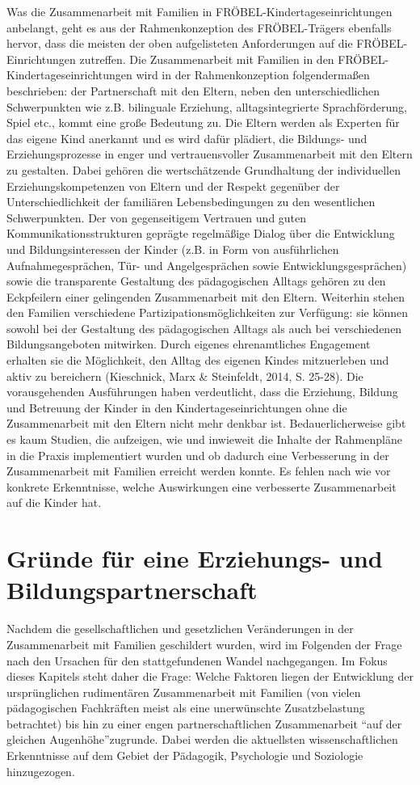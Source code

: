 \documentclass[12pt,a4paper]{article}
\begin{document}
Was die Zusammenarbeit mit Familien in FRÖBEL-Kindertageseinrichtungen anbelangt, geht es aus der Rahmenkonzeption des FRÖBEL-Trägers ebenfalls hervor, dass die meisten der oben aufgelisteten Anforderungen auf die FRÖBEL-Einrichtungen zutreffen. Die Zusammenarbeit mit Familien in den FRÖBEL-Kindertageseinrichtungen wird in der   Rahmenkonzeption folgendermaßen beschrieben: der Partnerschaft mit den Eltern, neben den unterschiedlichen Schwerpunkten wie z.B. bilinguale Erziehung, alltagsintegrierte Sprachförderung, Spiel etc., kommt eine große Bedeutung zu. Die Eltern werden als Experten für das eigene Kind anerkannt und es wird dafür plädiert, die Bildungs- und Erziehungsprozesse in enger und vertrauensvoller Zusammenarbeit mit den Eltern zu gestalten. Dabei gehören die wertschätzende Grundhaltung der individuellen Erziehungskompetenzen von Eltern und der Respekt gegenüber der Unterschiedlichkeit der familiären Lebensbedingungen zu den wesentlichen Schwerpunkten. Der von gegenseitigem Vertrauen und guten Kommunikationsstrukturen geprägte regelmäßige Dialog über die Entwicklung und Bildungsinteressen der Kinder (z.B. in Form von ausführlichen Aufnahmegesprächen, Tür- und Angelgesprächen sowie Entwicklungsgesprächen) sowie die transparente Gestaltung des pädagogischen Alltags gehören zu den Eckpfeilern einer gelingenden Zusammenarbeit mit den Eltern. Weiterhin stehen den Familien verschiedene Partizipationsmöglichkeiten zur Verfügung: sie können sowohl bei der Gestaltung des pädagogischen Alltags als auch bei verschiedenen Bildungsangeboten mitwirken. Durch eigenes ehrenamtliches Engagement erhalten sie die Möglichkeit, den Alltag des eigenen Kindes mitzuerleben und aktiv zu bereichern (Kieschnick, Marx \& Steinfeldt, 2014, S. 25-28).
	Die vorausgehenden Ausführungen haben verdeutlicht, dass die Erziehung, Bildung und Betreuung der Kinder in den Kindertageseinrichtungen ohne die Zusammenarbeit mit den Eltern nicht mehr denkbar ist. Bedauerlicherweise gibt es kaum Studien, die aufzeigen, wie und inwieweit die Inhalte der Rahmenpläne in die Praxis implementiert wurden und ob dadurch eine Verbesserung in der Zusammenarbeit mit Familien erreicht werden konnte. Es fehlen nach wie vor konkrete Erkenntnisse, welche Auswirkungen eine verbesserte Zusammenarbeit auf die Kinder hat.
\section{Gründe für eine Erziehungs- und Bildungspartnerschaft}
Nachdem die gesellschaftlichen und gesetzlichen Veränderungen in der Zusammenarbeit mit Familien geschildert wurden, wird im Folgenden der Frage nach den Ursachen für den stattgefundenen Wandel nachgegangen. Im Fokus dieses Kapitels steht daher die Frage: Welche Faktoren liegen der Entwicklung der ursprünglichen rudimentären Zusammenarbeit mit Familien (von vielen pädagogischen Fachkräften meist als eine unerwünschte Zusatzbelastung betrachtet) bis hin zu einer engen partnerschaftlichen Zusammenarbeit "`auf der gleichen Augenhöhe"'zugrunde. Dabei werden die aktuellsten wissenschaftlichen Erkenntnisse auf dem Gebiet der Pädagogik, Psychologie und Soziologie hinzugezogen.
\end{document}
